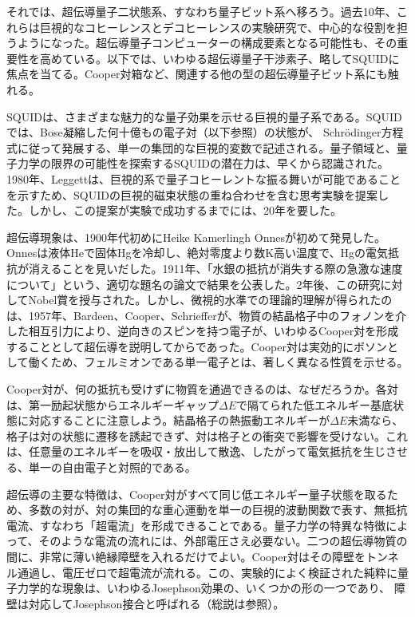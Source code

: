 それでは、超伝導量子二状態系、すなわち量子ビット系へ移ろう。過去10年、これらは巨視的なコヒーレンスとデコヒーレンスの実験研究で、中心的な役割を担うようになった。超伝導量子コンピューターの構成要素となる可能性も、その重要性を高めている\cite{ref274}。以下では、いわゆる超伝導量子干渉素子、略してSQUIDに焦点を当てる。Cooper対箱など、関連する他の型の超伝導量子ビット系にも触れる。

SQUIDは、さまざまな魅力的な量子効果を示せる巨視的量子系である。SQUIDでは、Bose凝縮した何十億もの電子対（以下参照）の状態が、
\hypertarget{srcpage:271}{}\label{srcpage:271}
Schrödinger方程式に従って発展する、単一の集団的な巨視的変数で記述される。量子領域と、量子力学の限界の可能性を探索するSQUIDの潜在力は、早くから認識された。1980年、Leggett\cite{ref275}は、巨視的系で量子コヒーレントな振る舞いが可能であることを示すため、SQUIDの巨視的磁束状態の重ね合わせを含む思考実験を提案した。しかし、この提案が実験で成功するまでには、20年を要した\cite{ref276,ref277}。

超伝導現象は、1900年代初めにHeike Kamerlingh Onnesが初めて発見した。Onnesは液体Heで固体Hgを冷却し、絶対零度より数K高い温度で、Hgの電気抵抗が消えることを見いだした。1911年、「水銀の抵抗が消失する際の急激な速度について」という、適切な題名の論文\cite{ref278}で結果を公表した。2年後、この研究に対してNobel賞を授与された。しかし、微視的水準での理論的理解が得られたのは、1957年、Bardeen、Cooper、Schrieffer\cite{ref279}が、物質の結晶格子中のフォノンを介した相互引力により、逆向きのスピンを持つ電子が、いわゆるCooper対を形成することとして超伝導を説明してからであった。Cooper対は実効的にボソンとして働くため、フェルミオンである単一電子とは、著しく異なる性質を示せる。

Cooper対が、何の抵抗も受けずに物質を通過できるのは、なぜだろうか。各対は、第一励起状態からエネルギーギャップ$\Delta E$で隔てられた低エネルギー基底状態に対応することに注意しよう。結晶格子の熱振動エネルギーが$\Delta E$未満なら、格子は対の状態に遷移を誘起できず、対は格子との衝突で影響を受けない。これは、任意量のエネルギーを吸収・放出して散逸、したがって電気抵抗を生じさせる、単一の自由電子と対照的である。

超伝導の主要な特徴は、Cooper対がすべて同じ低エネルギー量子状態を取るため、多数の対が、対の集団的な重心運動を単一の巨視的波動関数で表す、無抵抗電流、すなわち「超電流」を形成できることである。量子力学の特異な特徴によって、そのような電流の流れには、外部電圧さえ必要ない。二つの超伝導物質の間に、非常に薄い絶縁障壁を入れるだけでよい。Cooper対はその障壁をトンネル通過し、電圧ゼロで超電流が流れる。この、実験的によく検証された純粋に量子力学的な現象は、いわゆるJosephson効果の、いくつかの形の一つであり、
\hypertarget{srcpage:272}{}\label{srcpage:272}
障壁は対応してJosephson接合と呼ばれる（総説は\cite{ref280,ref281}参照）。

